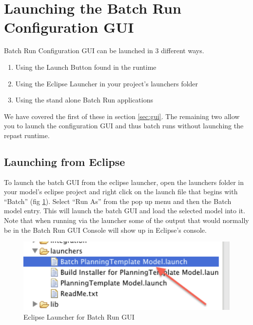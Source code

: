 \documentclass[11pt]{amsart}
\begin{document}
\label{sec:gui_launch}
\section{Launching the Batch Run Configuration GUI}
Batch Run Configuration GUI can be launched in 3 different ways.

\begin{enumerate}
\item Using the Launch Button found in the runtime
\item Using the Eclipse Launcher in your project's launchers folder
\item Using the stand alone Batch Run applications
\end{enumerate}
\noindent
We have covered the first of these in section \ref{sec:gui}. The remaining two allow you to launch the configuration GUI and thus batch runs without launching the repast runtime.

\subsection{Launching from Eclipse}
To launch the batch GUI from the eclipse launcher, open the launchers folder in your model's eclipse project and right click on the launch file that begins with ``Batch'' (fig \ref{fig:launcher}). Select ``Run As'' from the pop up menu and then the Batch model entry. This will launch the batch GUI and load the selected model into it. Note that when running via the launcher some of the output that would normally be in the Batch Run GUI Console will show up in Eclipse's console.

\begin{figure}[h]
\begin{center}
\vspace{.2in}
\centerline {
\includegraphics[width=6in]{images/batch_run_launcher.png}
}
\caption{Eclipse Launcher for Batch Run GUI}
\label{fig:launcher}
\end{center}
\end{figure}
\end{document}
